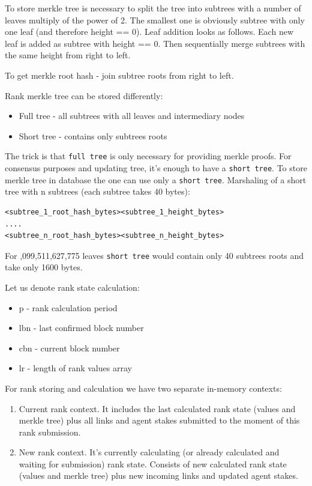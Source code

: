 \documentclass[8pt,oneside]{amsart}
\newcommand{\code}[1]{{\PlayBold #1}}
\begin{document}
To store merkle tree is necessary to split the tree into subtrees with a number of leaves multiply of the power of 2. The smallest one is obviously subtree with only one leaf (and therefore \code{height == 0}). Leaf addition looks as follows. Each new leaf is added as subtree with \code{height == 0}. Then sequentially merge subtrees with the same \code{height} from right to left.

To get merkle root hash - join subtree roots from right to left.

Rank merkle tree can be stored differently:

\begin{itemize}
\item[] Full tree - all subtrees with all leaves and intermediary nodes
\item[] Short tree - contains only subtrees roots
\end{itemize}

The trick is that \verb|full tree| is only necessary for providing merkle proofs. For consensus purposes and updating tree, it's enough to have a \verb|short tree|. To store merkle tree in database the one can use only a \verb|short tree|. Marshaling of a short tree with \code{n} subtrees (each subtree takes 40 bytes):  

\begin{lstlisting}
<subtree_1_root_hash_bytes><subtree_1_height_bytes>
....
<subtree_n_root_hash_bytes><subtree_n_height_bytes>
\end{lstlisting}

For \code{1,099,511,627,775} leaves \verb|short tree| would contain only 40 subtrees roots and take only 1600 bytes.

Let us denote rank state calculation:

\begin{itemize}
    \item[] \code{p} - rank calculation period 
    \item[] \code{lbn} - last confirmed block number  
    \item[] \code{cbn} - current block number  
    \item[] \code{lr} -  length of rank values array  
\end{itemize}

For rank storing and calculation we have two separate in-memory contexts:

\begin{enumerate}
\item Current rank context. It includes the last calculated rank state (values and merkle tree) plus
all links and agent stakes submitted to the moment of this rank submission.
\item New rank context. It's currently calculating (or already calculated and waiting for submission) rank state. Consists of new calculated rank state (values and merkle tree) plus new incoming links and updated agent stakes.
\end{enumerate}
\end{document}
